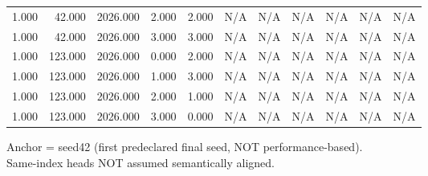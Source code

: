 \begin{table}[h!]
\begin{tabular}{lrrrrrrrrrr}
1.000 & 42.000 & 2026.000 & 2.000 & 2.000 & N/A & N/A & N/A & N/A & N/A & N/A \\
1.000 & 42.000 & 2026.000 & 3.000 & 3.000 & N/A & N/A & N/A & N/A & N/A & N/A \\
1.000 & 123.000 & 2026.000 & 0.000 & 2.000 & N/A & N/A & N/A & N/A & N/A & N/A \\
1.000 & 123.000 & 2026.000 & 1.000 & 3.000 & N/A & N/A & N/A & N/A & N/A & N/A \\
1.000 & 123.000 & 2026.000 & 2.000 & 1.000 & N/A & N/A & N/A & N/A & N/A & N/A \\
1.000 & 123.000 & 2026.000 & 3.000 & 0.000 & N/A & N/A & N/A & N/A & N/A & N/A \\
\bottomrule
\end{tabular}
\vspace{4pt}
\footnotesize{Anchor = seed42 (first predeclared final seed, NOT performance-based).}\\
\footnotesize{Same-index heads NOT assumed semantically aligned.}\\
\end{table}
